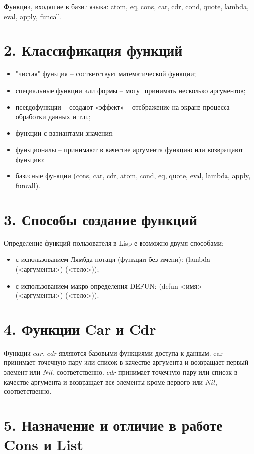 \documentclass[12pt]{report}
\begin{document}
Функции, входящие в базис языка: atom, eq, cons, car, cdr, cond, quote, lambda, eval, apply, funcall.


\section*{2. Классификация функций}

\begin{itemize}
	\item "чистая" функция -- соответствует математической функции;
	\item специальные функции или формы -- могут принимать несколько аргументов;
	\item псевдофункции -- создают «эффект» -- отображение на экране процесса обработки данных и т.п.;
	\item функции с вариантами значения;
	\item функционалы -- принимают в качестве аргумента функцию или возвращают функцию;
	\item базисные функции (cons, car, cdr, atom, cond, eq, quote, eval, lambda, apply, funcall).
\end{itemize}

\section*{3. Способы создание функций}

Определение функций пользователя в Lisp-е возможно двумя способами:
\begin{itemize}
	\item с использованием Лямбда-нотаци (функции без имени): (lambda (<аргументы>) (<тело>));
	\item с использованием макро определения DEFUN: (defun <имя> (<аргументы>) (<тело>)).
\end{itemize}

\section*{4. Функции Car и Cdr}

Функции $car$, $cdr$ являются базовыми функциями доступа к данным. car принимает точечную пару или список в качестве аргумента и возвращает первый элемент или $Nil$, соответственно. $cdr$ принимает точечную пару или список в качестве аргумента и возвращает все элементы кроме первого или $Nil$, соответственно.

\section*{5. Назначение и отличие в работе Cons и List}
\end{document}
